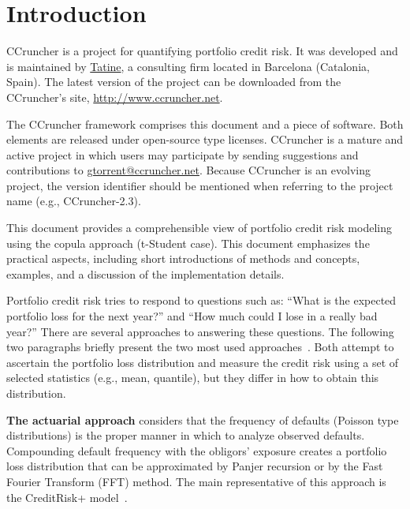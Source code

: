 \documentclass[11pt,fleqn]{book} %
\def\numversion{2.3}
\begin{document}
\chapter{Introduction}

CCruncher is a project for quantifying portfolio credit risk. 
It was developed and is maintained by \href{http://www.tatine.es}{Tatine}, a 
consulting firm located in Barcelona (Catalonia, Spain). The latest version 
of the project can be downloaded from the CCruncher's site, 
\url{http://www.ccruncher.net}.

The CCruncher framework comprises this document and a piece of software. 
Both elements are released under open-source type licenses. 
CCruncher is a mature and active project in which users may participate by 
sending suggestions and contributions to \href{mailto:gtorrent@ccruncher.net}
{gtorrent@ccruncher.net}. Because CCruncher is an evolving project, the version
identifier should be mentioned when referring to the project name 
(e.g., CCruncher-\numversion).

This document provides a comprehensible view of portfolio credit risk modeling 
using the copula approach (t-Student case). This document emphasizes the 
practical aspects, including short introductions of methods and concepts, 
examples, and a discussion of the implementation details. 

Portfolio credit risk tries to respond to questions such as: ``What is the 
expected portfolio loss for the next year?'' and ``How much could I 
lose in a really bad year?'' There are several approaches to answering these 
questions. The following two paragraphs briefly present the two most used 
approaches~\cite{crouhy:2000}\cite[chap. 2.4]{bluhm:2002}. 
Both attempt to ascertain the portfolio loss distribution and measure 
the credit risk using a set of selected statistics (e.g., mean, quantile), 
but they differ in how to obtain this distribution. 

\textbf{The actuarial approach} considers that the frequency of defaults 
(Poisson type distributions) is the proper manner in which to analyze observed 
defaults. Compounding default frequency with the obligors' exposure creates a
portfolio loss distribution that can be approximated by Panjer recursion or 
by the Fast Fourier Transform (FFT) method. The main representative of this 
approach is the CreditRisk+ model~\cite{creditrisk+:1997}.
\end{document}
